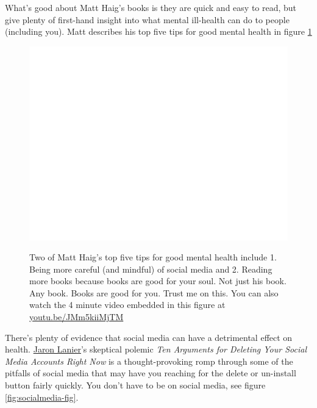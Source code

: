 \documentclass[
]{book}
\begin{document}
What's good about Matt Haig's books is they are quick and easy to read, but give plenty of first-hand insight into what mental ill-health can do to people (including you). Matt describes his top five tips for good mental health in figure \ref{fig:haig-fig}

\begin{figure}

{\centering \href{https://www.youtube.com/embed/JMm5kiiMjTM}{\includegraphics[width=0.99\linewidth]{cdyf_files/figure-latex/haig-fig-1} }

}

\caption{Two of Matt Haig's top five tips for good mental health include 1. Being more careful (and mindful) of social media and 2. Reading more books because books are good for your soul. Not just his book. Any book. Books are good for you. Trust me on this. You can also watch the 4 minute video embedded in this figure at \href{https://youtu.be/JMm5kiiMjTM}{youtu.be/JMm5kiiMjTM} \citep{youtube-haig}}\label{fig:haig-fig}
\end{figure}



There's plenty of evidence that social media can have a detrimental effect on health. \href{https://en.wikipedia.org/wiki/Jaron_Lanier}{Jaron Lanier}'s skeptical polemic \emph{Ten Arguments for Deleting Your Social Media Accounts Right Now} \citep{lanier} is a thought-provoking romp through some of the pitfalls of social media that may have you reaching for the delete or un-install button fairly quickly. You don't have to be on social media, see figure \ref{fig:socialmedia-fig}.
\end{document}

